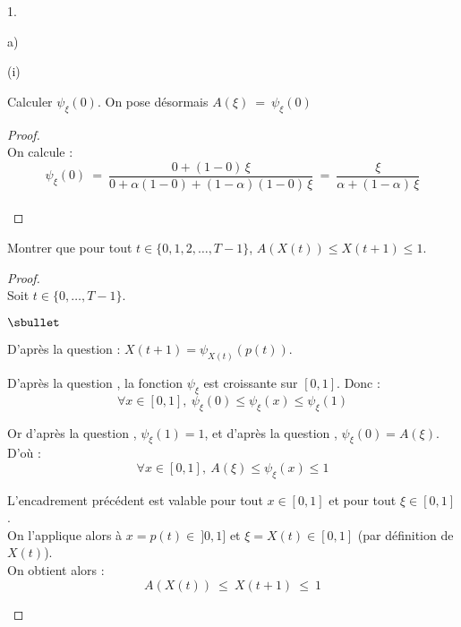 \documentclass[11pt]{article}%
\begin{document}
\begin{noliste}{1.}
\begin{noliste}{a)}
    
    \item 
    \begin{nonoliste}{(i)}
      \item Calculer $\psi_\xi(0)$. On pose désormais
      $
        A(\xi) \ = \ \psi_\xi(0)
      $
      
      \begin{proof}~\\
        On calcule :
        \[
          \psi_\xi(0) \ = \ \dfrac{0 + (1-0) \, \xi}{0 + \alpha
          (1-0) + (1-\alpha)(1-0) \, \xi} \ = \ 
          \dfrac{\xi}{\alpha + (1-\alpha) \, \xi}
        \]
        ~\\[-1cm]
      \end{proof}
      
      
      \newpage

      
      \item Montrer que pour tout $t\in \{0,1,2, \ldots, T-1\}$, 
      $A(X(t)) \leq X(t+1) \leq 1$.
      
      \begin{proof}~\\
      Soit $t \in \{0, \ldots, T-1\}$.
        \begin{noliste}{$\sbullet$}
	  \item D'après la question  : $X(t+1) = 
	  \psi_{X(t)}(p(t))$.
	  
	  \item D'après la question , la fonction 
	  $\psi_\xi$ est croissante sur $[0,1]$. Donc :
	  \[
	    \forall x \in [0,1], \ \psi_\xi(0) \leq \psi_\xi(x) 
	    \leq \psi_\xi(1)
	  \]
	  
	  \item Or d'après la question , $\psi_\xi(1)=1$, et
	  d'après la question , $\psi_\xi(0)=A(\xi)$.
	  D'où :
	  \[
	    \forall x \in [0,1], \ A(\xi) \leq \psi_\xi(x) \leq 1
	  \]
	  
	  \item L'encadrement précédent est valable pour tout $x \in
	  [0,1]$ et pour tout $\xi \in [0,1]$.\\
	  On l'applique alors à $x=p(t) \in \ ]0,1]$ et $\xi = 
	  X(t) \in [0,1]$ (par définition de $X(t)$).\\
	  On obtient alors :
	  \[
	    A(X(t)) \ \leq \ X(t+1) \ \leq \ 1
	  \]
        \end{noliste}
        

\end{proof}
\end{nonoliste}
\end{noliste}
\end{noliste}
\end{document}
